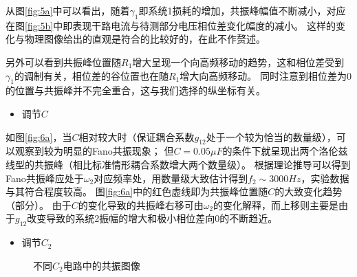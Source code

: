 \documentclass[12pt, a4paper]{ctexart}
\begin{document}
从图\ref{fig:5a}中可以看出，随着$\gamma_1$即系统1损耗的增加，共振峰幅值不断减小，对应在图\ref{fig:5b}中即表现干路电流与待测部分电压相位差变化幅度的减小。
这样的变化与物理图像给出的直观是符合的比较好的，在此不作赘述。

另外可以看到共振峰位置随$R_1$增大呈现一个向高频移动的趋势，这和相位差受到$\gamma_1$的调制有关，相位差的谷位置也在随$R_1$增大向高频移动。
同时注意到相位差为0的位置与共振峰并不完全重合，这与我们选择的纵坐标有关。

\begin{itemize}
    \item 调节$C$
\end{itemize}

如图\ref{fig:6a}，当$C$相对较大时（保证耦合系数$g_{12}$处于一个较为恰当的数量级），可以观察到较为明显的Fano共振现象；
但$C = 0.05\mu F$的条件下就呈现出两个洛伦兹线型的共振峰（相比标准情形耦合系数增大两个数量级）。
根据理论推导可以得到Fano共振峰应处于$\omega_2$对应频率处，用数量级大致估计得到$f_2 \sim 3000Hz$，实验数据与其符合程度较高。
图\ref{fig:6a}中的红色虚线即为共振峰位置随$C$的大致变化趋势（部分）。
由于$C$的变化导致的共振峰右移可由$\omega_2$的变化解释，而上移则主要是由于$g_{12}$改变导致的系统2振幅的增大和极小相位差向0的不断趋近。

\begin{itemize}
    \item 调节$C_2$
\end{itemize}

\begin{figure}[!t]
    \centering
    \caption{不同$C_2$电路中的共振图像}
\end{figure}
\end{document}
